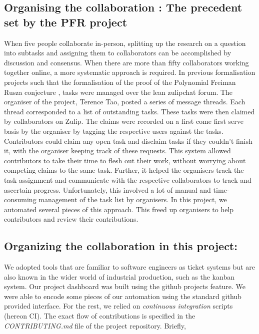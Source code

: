 \subsection{Organising the collaboration : The precedent set by the PFR project}
When five people collaborate in-person, splitting up the research on a question into subtasks and assigning them to collaborators can be accomplished by discussion and consensus. When there are more than fifty collaborators working together online, a more systematic approach is required. In previous formalisation projects such that the formalisation of the proof of the Polynomial Freiman Rusza conjecture \cite{PFR_Tao_Dilles_2023}, tasks were managed over the lean zulipchat forum. The organiser of the project, Terence Tao, posted a series of message threads. Each thread corresponded to a list of outstanding tasks. These tasks were then claimed by collaborators on Zulip. The claims were recorded on a first come first serve basis by the organiser by tagging the respective users against the tasks. Contributors could claim any open task and disclaim tasks if they couldn't finish it, with the organiser keeping track of these requests. This system allowed contributors to take their time to flesh out their work, without worrying about competing claims to the same task. Further, it helped the organisers track the task assignment and communicate with the respective collaborators to track and ascertain progress. Unfortunately, this involved a lot of manual and time-consuming management of the task list by organisers. In this project, we automated several pieces of this approach. This freed up organisers to help contributors and review their contributions.

\subsection{Organizing the collaboration in this project:}
We adopted tools that are familiar to software engineers as ticket systems but are also known in the wider world of industrial production, such as the kanban system. Our project dashboard was built using the github projects feature. We were able to encode some pieces of our automation using the standard github provided interface. For the rest, we relied on \emph{continuous integration} scripts (hereon CI). The exact flow of contributions is specified in the \emph{CONTRIBUTING.md} file of the project repository\cite{The_Equational_Theories_repository}. Briefly,

